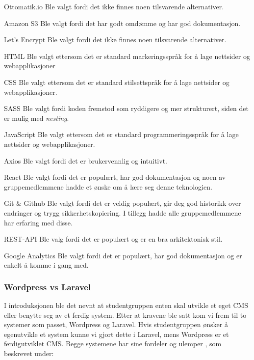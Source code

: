 \begin{compactdesc}
\item[Ottomatik.io] Ble valgt fordi det ikke finnes noen tilsvarende alternativer.
\item[Amazon S3] Ble valgt fordi det har godt omdømme og har god dokumentasjon.
\item[Let’s Encrypt] Ble valgt fordi det ikke finnes noen tilsvarende alternativer.
\item[HTML] Ble valgt ettersom det er standard markeringsspråk for å lage nettsider og webapplikasjoner
\item[CSS] Ble valgt ettersom det er standard stilsettspråk for å lage nettsider og webapplikasjoner.
\item[SASS] Ble valgt fordi koden fremstod som ryddigere og mer strukturert, siden det er mulig med \textit{nesting}.
\item[JavaScript] Ble valgt ettersom det er standard programmeringsspråk for å lage nettsider og webapplikasjoner.
\item[Axios] Ble valgt fordi det er brukervennlig og intuitivt.
\item[React] Ble valgt fordi det er populært, har god dokumentasjon og noen av gruppemedlemmene hadde et ønske om å lære seg denne teknologien.
\item[Git \& Github] Ble valgt fordi det er veldig populært, gir deg god historikk over endringer og trygg sikkerhetskopiering. I tillegg hadde alle gruppemedlemmene har erfaring med disse.
\item[REST-API] Ble valg fordi det er populært og er en bra arkitektonisk stil.
\item[Google Analytics] Ble valgt fordi det er populært, har god dokumentasjon og er enkelt å komme i gang med.
\end{compactdesc}

\subsubsection{Wordpress vs Laravel}
I introduksjonen ble det nevnt at studentgruppen enten skal utvikle et eget CMS eller benytte seg av et ferdig system. Etter at kravene ble satt kom vi frem til to systemer som passet, Wordpress og Laravel. Hvis studentgruppen ønsker å egenutvikle et system kunne vi gjort dette i Laravel, mens Wordpress er et ferdigutviklet CMS. Begge systemene har sine fordeler og ulemper \cite{cbcp2019lvw}, som beskrevet under:

